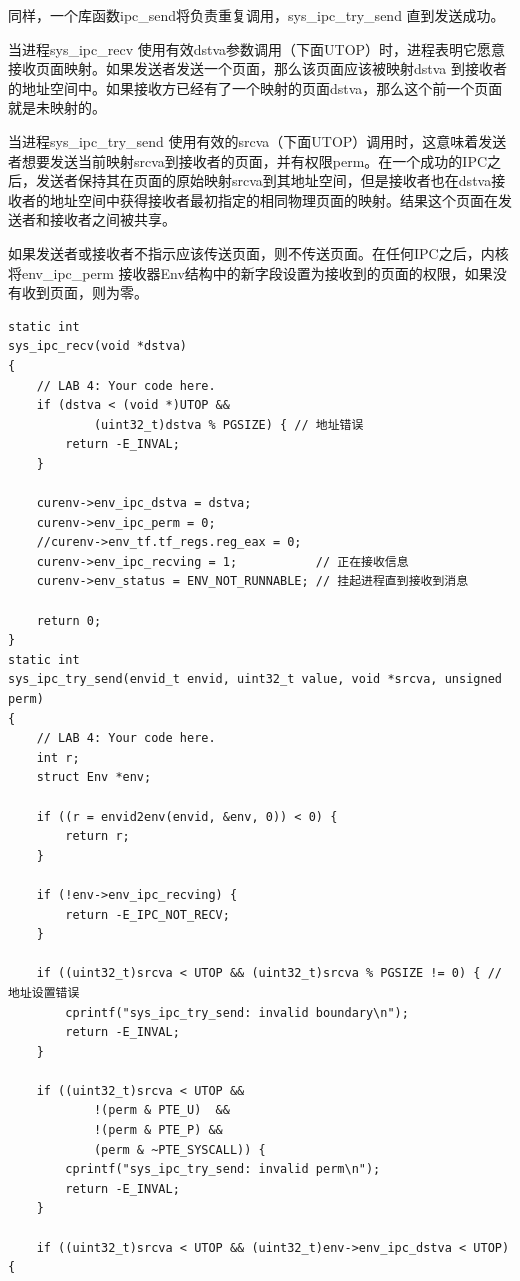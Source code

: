\begin{ExerciseList}
同样，一个库函数ipc\_send将负责重复调用，sys\_ipc\_try\_send 直到发送成功。

当进程sys\_ipc\_recv 使用有效dstva参数调用（下面UTOP）时，进程表明它愿意接收页面映射。如果发送者发送一个页面，那么该页面应该被映射dstva 到接收者的地址空间中。如果接收方已经有了一个映射的页面dstva，那么这个前一个页面就是未映射的。

当进程sys\_ipc\_try\_send 使用有效的srcva（下面UTOP）调用时，这意味着发送者想要发送当前映射srcva到接收者的页面，并有权限perm。在一个成功的IPC之后，发送者保持其在页面的原始映射srcva到其地址空间，但是接收者也在dstva接收者的地址空间中获得接收者最初指定的相同物理页面的映射。结果这个页面在发送者和接收者之间被共享。

如果发送者或接收者不指示应该传送页面，则不传送页面。在任何IPC之后，内核将env\_ipc\_perm 接收器Env结构中的新字段设置为接收到的页面的权限，如果没有收到页面，则为零。


\begin{verbatim}
static int
sys_ipc_recv(void *dstva)
{
    // LAB 4: Your code here.
    if (dstva < (void *)UTOP &&
            (uint32_t)dstva % PGSIZE) { // 地址错误
        return -E_INVAL;
    }

    curenv->env_ipc_dstva = dstva;
    curenv->env_ipc_perm = 0;
    //curenv->env_tf.tf_regs.reg_eax = 0;
    curenv->env_ipc_recving = 1;           // 正在接收信息
    curenv->env_status = ENV_NOT_RUNNABLE; // 挂起进程直到接收到消息

    return 0;
}
static int
sys_ipc_try_send(envid_t envid, uint32_t value, void *srcva, unsigned perm)
{
    // LAB 4: Your code here.
    int r;
    struct Env *env;

    if ((r = envid2env(envid, &env, 0)) < 0) {
        return r;
    }

    if (!env->env_ipc_recving) {
        return -E_IPC_NOT_RECV;
    }

    if ((uint32_t)srcva < UTOP && (uint32_t)srcva % PGSIZE != 0) { // 地址设置错误
        cprintf("sys_ipc_try_send: invalid boundary\n");
        return -E_INVAL;
    }

    if ((uint32_t)srcva < UTOP &&
            !(perm & PTE_U)  &&
            !(perm & PTE_P) &&
            (perm & ~PTE_SYSCALL)) {
        cprintf("sys_ipc_try_send: invalid perm\n");
        return -E_INVAL;
    }

    if ((uint32_t)srcva < UTOP && (uint32_t)env->env_ipc_dstva < UTOP) {


\end{verbatim}
\end{ExerciseList}
